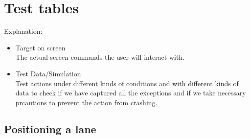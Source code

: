 \newcommand{\pass}{[\sethlcolor{green}\hl{PASS}] / [\sethlcolor{red}\hl{FAIL}]}
\section{Test tables}
Explanation: 
\begin{itemize}
	\item Target on screen\\
	The actual screen commands the user will interact with.
	\item Test Data/Simulation\\
	Test actions under different kinds of conditions and with different kinds of data to check if we have captured all the exceptions and if we take necessary prcautions to prevent the action from crashing.
\end{itemize}

\newpage

\subsection{Positioning a lane}

